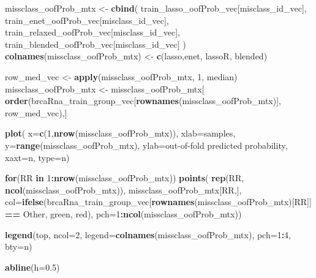 \documentclass[
]{book}
\newenvironment{Shaded}{\begin{snugshade}}{\end{snugshade}}
\newcommand{\ControlFlowTok}[1]{\textcolor[rgb]{0.13,0.29,0.53}{\textbf{#1}}}
\newcommand{\DataTypeTok}[1]{\textcolor[rgb]{0.13,0.29,0.53}{#1}}
\newcommand{\DecValTok}[1]{\textcolor[rgb]{0.00,0.00,0.81}{#1}}
\newcommand{\FloatTok}[1]{\textcolor[rgb]{0.00,0.00,0.81}{#1}}
\newcommand{\KeywordTok}[1]{\textcolor[rgb]{0.13,0.29,0.53}{\textbf{#1}}}
\newcommand{\NormalTok}[1]{#1}
\newcommand{\OperatorTok}[1]{\textcolor[rgb]{0.81,0.36,0.00}{\textbf{#1}}}
\newcommand{\StringTok}[1]{\textcolor[rgb]{0.31,0.60,0.02}{#1}}
\begin{document}
\begin{Shaded}
\begin{Highlighting}[]
\NormalTok{missclass\_oofProb\_mtx <{-}}\StringTok{ }\KeywordTok{cbind}\NormalTok{(}
\NormalTok{ train\_lasso\_oofProb\_vec[misclass\_id\_vec],}
\NormalTok{ train\_enet\_oofProb\_vec[misclass\_id\_vec],}
\NormalTok{ train\_relaxed\_oofProb\_vec[misclass\_id\_vec],}
\NormalTok{ train\_blended\_oofProb\_vec[misclass\_id\_vec]}
\NormalTok{)}
\KeywordTok{colnames}\NormalTok{(missclass\_oofProb\_mtx) <{-}}\StringTok{ }\KeywordTok{c}\NormalTok{(}\StringTok{\textquotesingle{}lasso\textquotesingle{}}\NormalTok{,}\StringTok{\textquotesingle{}enet\textquotesingle{}}\NormalTok{, }\StringTok{\textquotesingle{}lassoR\textquotesingle{}}\NormalTok{, }\StringTok{\textquotesingle{}blended\textquotesingle{}}\NormalTok{)}

\NormalTok{row\_med\_vec <{-}}\StringTok{ }\KeywordTok{apply}\NormalTok{(missclass\_oofProb\_mtx, }\DecValTok{1}\NormalTok{, median)}
\NormalTok{missclass\_oofProb\_mtx <{-}}\StringTok{ }\NormalTok{missclass\_oofProb\_mtx[}
  \KeywordTok{order}\NormalTok{(brcaRna\_train\_group\_vec[}\KeywordTok{rownames}\NormalTok{(missclass\_oofProb\_mtx)], row\_med\_vec),]}

\KeywordTok{plot}\NormalTok{(}
 \DataTypeTok{x=}\KeywordTok{c}\NormalTok{(}\DecValTok{1}\NormalTok{,}\KeywordTok{nrow}\NormalTok{(missclass\_oofProb\_mtx)), }\DataTypeTok{xlab=}\StringTok{\textquotesingle{}samples\textquotesingle{}}\NormalTok{,}
 \DataTypeTok{y=}\KeywordTok{range}\NormalTok{(missclass\_oofProb\_mtx), }\DataTypeTok{ylab=}\StringTok{\textquotesingle{}out{-}of{-}fold predicted probability\textquotesingle{}}\NormalTok{,}
 \DataTypeTok{xaxt=}\StringTok{\textquotesingle{}n\textquotesingle{}}\NormalTok{, }\DataTypeTok{type=}\StringTok{\textquotesingle{}n\textquotesingle{}}\NormalTok{)}

\ControlFlowTok{for}\NormalTok{(RR }\ControlFlowTok{in} \DecValTok{1}\OperatorTok{:}\KeywordTok{nrow}\NormalTok{(missclass\_oofProb\_mtx))}
\KeywordTok{points}\NormalTok{(}
 \KeywordTok{rep}\NormalTok{(RR, }\KeywordTok{ncol}\NormalTok{(missclass\_oofProb\_mtx)), }
\NormalTok{ missclass\_oofProb\_mtx[RR,],}
 \DataTypeTok{col=}\KeywordTok{ifelse}\NormalTok{(brcaRna\_train\_group\_vec[}\KeywordTok{rownames}\NormalTok{(missclass\_oofProb\_mtx)[RR]] }\OperatorTok{==}\StringTok{ \textquotesingle{}Other\textquotesingle{}}\NormalTok{,}
  \StringTok{\textquotesingle{}green\textquotesingle{}}\NormalTok{, }\StringTok{\textquotesingle{}red\textquotesingle{}}\NormalTok{),}
 \DataTypeTok{pch=}\DecValTok{1}\OperatorTok{:}\KeywordTok{ncol}\NormalTok{(missclass\_oofProb\_mtx))}

\KeywordTok{legend}\NormalTok{(}\StringTok{\textquotesingle{}top\textquotesingle{}}\NormalTok{, }\DataTypeTok{ncol=}\DecValTok{2}\NormalTok{, }\DataTypeTok{legend=}\KeywordTok{colnames}\NormalTok{(missclass\_oofProb\_mtx), }
 \DataTypeTok{pch=}\DecValTok{1}\OperatorTok{:}\DecValTok{4}\NormalTok{, }\DataTypeTok{bty=}\StringTok{\textquotesingle{}n\textquotesingle{}}\NormalTok{)}

\KeywordTok{abline}\NormalTok{(}\DataTypeTok{h=}\FloatTok{0.5}\NormalTok{)}
\end{Highlighting}
\end{Shaded}
\end{document}
